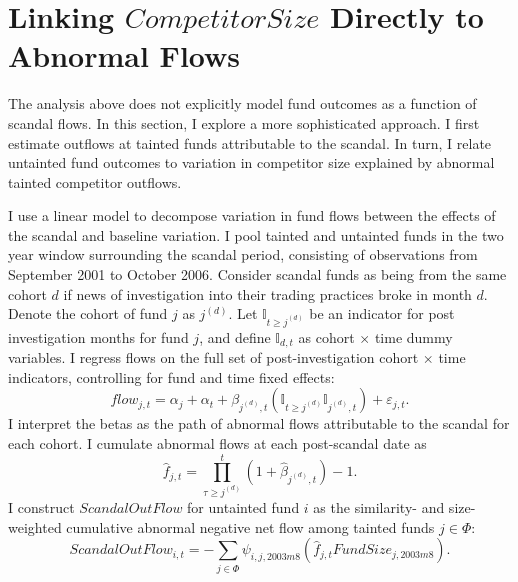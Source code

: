 \documentclass[]{book}
\theoremstyle{definition}
\theoremstyle{definition}
\theoremstyle{definition}
\theoremstyle{remark}
\begin{document}
\hypertarget{sec:linkFlows}{%
\section{\texorpdfstring{Linking \(CompetitorSize\) Directly to Abnormal
Flows}{Linking CompetitorSize Directly to Abnormal Flows}}\label{sec:linkFlows}}

The analysis above does not explicitly model fund outcomes as a function
of scandal flows. In this section, I explore a more sophisticated
approach. I first estimate outflows at tainted funds attributable to the
scandal. In turn, I relate untainted fund outcomes to variation in
competitor size explained by abnormal tainted competitor outflows.

I use a linear model to decompose variation in fund flows between the
effects of the scandal and baseline variation. I pool tainted and
untainted funds in the two year window surrounding the scandal period,
consisting of observations from September 2001 to October 2006. Consider
scandal funds as being from the same cohort \(d\) if news of
investigation into their trading practices broke in month \(d\). Denote
the cohort of fund \(j\) as \(j^{(d)}\). Let
\(\mathbb{I}_{t\geq j^{(d)}}\) be an indicator for post investigation
months for fund \(j\), and define \(\mathbb{I}_{d,t}\) as cohort
\(\times\) time dummy variables. I regress flows on the full set of
post-investigation cohort \(\times\) time indicators, controlling for
fund and time fixed effects: \begin{equation}
flow_{j,t}=\alpha_j+\alpha_t +\beta_{j^{(d)},t} \left( \mathbb{I}_{t\geq j^{(d)}}\mathbb{I}_{j^{(d)},t} \right) + \varepsilon_{j,t}.
\label{eq:cohortReg}
\end{equation} I interpret the betas as the path of abnormal flows
attributable to the scandal for each cohort. I cumulate abnormal flows
at each post-scandal date as \begin{equation}
\hat{f}_{j,t} = \prod_{\tau\geq j^{(d)}}^t \left(1+\hat{\beta}_{j^{(d)},t}\right) - 1.
\end{equation} I construct \(ScandalOutFlow\) for untainted fund \(i\)
as the similarity- and size-weighted cumulative abnormal negative net
flow among tainted funds \(j\in\Phi\): \begin{equation}
ScandalOutFlow_{i,t}= -\sum_{j\in \Phi} \psi_{i,j,2003m8} \left(\hat{f}_{j,t} FundSize_{j,2003m8} \right).
\label{eq:scandalOutFlow}
\end{equation}
\end{document}

